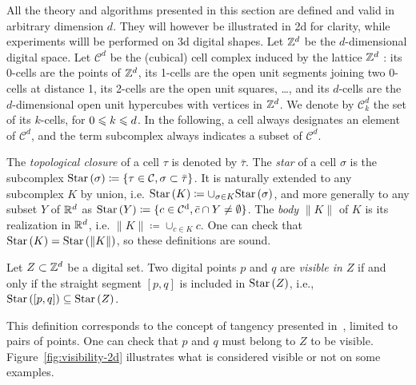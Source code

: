     All the theory and algorithms presented in this section are
    defined and valid in arbitrary dimension $d$. They will however be
    illustrated in 2d for clarity, while experiments willl be
    performed on 3d digital shapes.  Let $\mathbb{Z}^d$ be the $d$-dimensional
    digital space.  Let $\mathcal{C}^d$ be the (cubical) cell complex
    induced by the lattice $\mathbb{Z}^d$ : its 0-cells are the points of
    $\mathbb{Z}^d$, its 1-cells are the open unit segments joining two 0-cells
    at distance 1, its 2-cells are the open unit squares, \ldots, and
    its $d$-cells are the $d$-dimensional open unit hypercubes with
    vertices in $\mathbb{Z}^d$.  We denote by $\mathcal{C}^d_k$ the set of its
    $k$-cells, for $0 \leqslant k \leqslant d$.  In the following, a cell always
    designates an element of $\mathcal{C}^d$, and the term subcomplex
    always indicates a subset of $\mathcal{C}^d$.

    The \emph{topological closure} of a cell $\tau$ is denoted by
    $\bar{\tau}$. The \emph{star} of a cell $\sigma$ is the subcomplex
    $\mathrm{Star}\left(\sigma\right)\coloneqq\{\tau \in \mathcal{C}, \sigma \subset \bar{\tau}
    \}$. It is naturally extended to any subcomplex $K$ by union,
    i.e. $\mathrm{Star}\left(K\right) \coloneqq \cup_{\sigma \in K} \mathrm{Star}\left(\sigma\right)$, and more
    generally to any subset $Y$ of $\mathbb{R}^d$ as $\mathrm{Star}\left(Y\right)\coloneqq\{ c \in \operatorname{\mathcal{C}^d},
    \bar{c} \cap Y \neq \emptyset \}$. The \emph{body} $\|K\|$ of $K$
    is its realization in $\mathbb{R}^d$, i.e. $\|K\|\coloneqq\cup_{c \in K} c$. One
    can check that $\mathrm{Star}\left(K\right)=\mathrm{Star}\left(\|K\|\right)$, so these definitions are
    sound.

    \begin{definition}[Visibility]
      Let $Z \subset \mathbb{Z}^d$ be a digital set. Two digital points $p$
      and $q$ are \emph{visible in $Z$} if and only if the straight
      segment $[p, q]$ is included in $\mathrm{Star}\left(Z\right)$, i.e., $\mathrm{Star}\left([p, q]\right)
      \subseteq \mathrm{Star}\left(Z\right)$.
    \end{definition}
    This definition corresponds to the concept of tangency presented
    in~\cite{lachaud:2022-jmiv}, limited to pairs of points. One can
    check that $p$ and $q$ must belong to $Z$ to be visible.
    Figure~\ref{fig:visibility-2d} illustrates what is considered
    visible or not on some examples.


